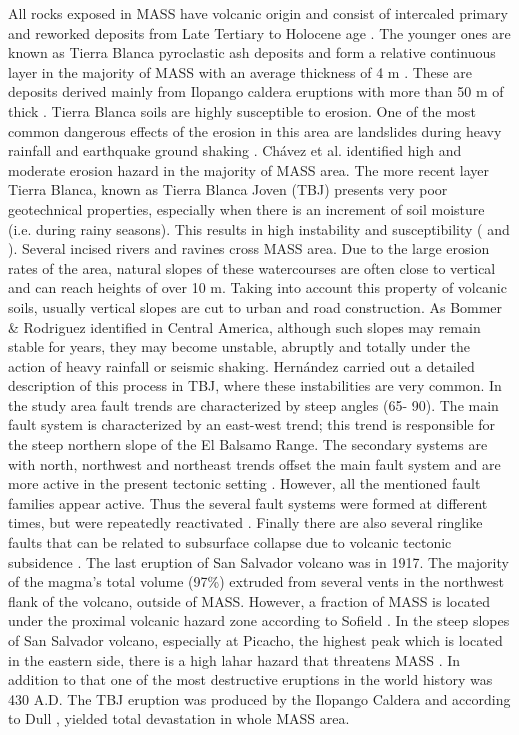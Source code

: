 \documentclass[11pt,twoside]{rmta2010eng}%
\begin{document}
All rocks exposed in MASS have volcanic origin and consist of intercaled primary and reworked deposits from Late Tertiary to Holocene age \cite{schmidt1975}. The younger ones are known as Tierra Blanca pyroclastic ash deposits and form a relative continuous layer in the majority of MASS with an average thickness of 4 m \cite{schmidt1975}. These are deposits derived mainly from Ilopango caldera eruptions with more than 50 m of thick \cite{schmidt1975}. Tierra Blanca soils are highly susceptible to erosion. One of the most common dangerous effects of the erosion in this area are landslides during heavy rainfall and earthquake ground shaking \cite{schmidt1975}. Ch\'{a}vez et al. \cite{chavez2014a} identified high and moderate erosion hazard in the majority of MASS area. The more recent layer Tierra Blanca, known as Tierra Blanca Joven (TBJ) \cite{hernan2004} presents very poor geotechnical properties, especially when there is an increment of soil moisture (i.e. during rainy seasons). This results in high instability and susceptibility (\cite{chavez2014b} and \cite{rolo2004}). Several incised rivers and ravines cross MASS area. Due to the large erosion rates of the area, natural slopes of these watercourses are often close to vertical and can reach heights of over 10 m. Taking into account this property of volcanic soils, usually vertical slopes are cut to urban and road construction. As Bommer \& Rodriguez \cite{bommer} identified in Central America, although such slopes may remain stable for years, they may become unstable, abruptly and totally under the action of heavy rainfall or seismic shaking. Hern\'{a}ndez \cite{hernan2004} carried out a detailed description of this process in TBJ, where these instabilities are very common. 
In the study area fault trends are characterized by steep angles (65\textdegree - 90\textdegree). The main fault system is characterized by an east-west trend; this trend is responsible for the steep northern slope of the El Balsamo Range.  The secondary systems are with north, northwest and northeast trends offset the main fault system and are more active in the present tectonic setting \cite{schmidt1975}. However, all the mentioned fault families appear active. Thus the several fault systems were formed at different times, but were repeatedly reactivated \cite{rymer1987}. Finally there are also several ringlike faults that can be related to subsurface collapse due to volcanic tectonic subsidence \cite{schmidt1975}. The last eruption of San Salvador volcano was in 1917.  The majority of the magma's total volume (97\%) extruded from several vents in the northwest flank of the volcano, outside of MASS. However, a fraction of MASS is located under the proximal volcanic hazard zone according to Sofield \cite{sofield2004}. In the steep slopes of San Salvador volcano, especially at Picacho, the highest peak which is located in the eastern side, there is a high lahar hazard that threatens MASS \cite{major2004}. In addition to that one of the most destructive eruptions in the world history was 430 A.D. The TBJ eruption was produced by the Ilopango Caldera and  according to Dull \cite{dull2004}, yielded total devastation in whole MASS area. 
\end{document}
